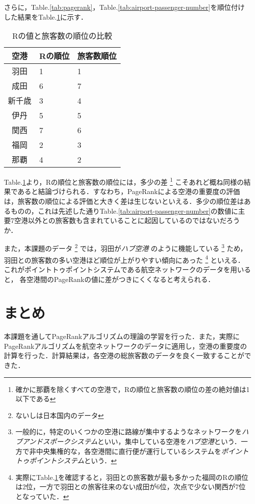 \documentclass[a4j, dvipdfmx, twocolumn]{jsarticle}
\newcommand{\tabref}[1]{Table.\ref{#1}}
\begin{document}
さらに，\tabref{tab:pagerank}，\tabref{tab:airport-passenger-number}を順位付けした結果を\tabref{tab:pagerank-airport-passenger-number}に示す．
\begin{table}[htb]
  \begin{tabular}{cll}
    \hline
    空港 & Rの順位 & 旅客数順位 \\
    \hline
    \hline
    羽田 & 1 & 1 \\
    成田 & 6 & 7 \\
    新千歳 & 3 & 4 \\
    伊丹 & 5 & 5 \\
    関西 & 7 & 6 \\
    福岡 & 2 & 3 \\
    那覇 & 4 & 2 \\
    \hline
  \end{tabular}
  \centering
  \caption{Rの値と旅客数の順位の比較}
  \label{tab:pagerank-airport-passenger-number}
\end{table}
\tabref{tab:pagerank-airport-passenger-number}より，Rの順位と旅客数の順位には，多少の差
\footnote{確かに那覇を除くすべての空港で，Rの順位と旅客数の順位の差の絶対値は1以下である}
こそあれど概ね同様の結果であると結論づけられる．すなわち，PageRankによる空港の重要度の評価は，旅客数の順位による評価と大きく差は生じないといえる．多少の順位差はあるものの，これは先述した通り\tabref{tab:airport-passenger-number}の数値に主要7空港以外との旅客数も含まれていることに起因しているのではないだろうか．

また，本課題のデータ
\footnote{ないしは日本国内のデータ}
では，羽田が\emph{ハブ空港} のように機能している
\footnote{一般的に，特定のいくつかの空港に路線が集中するようなネットワークを\emph{ハブアンドスポークシステム}といい，集中している空港を\emph{ハブ空港}という．一方で非中央集権的な，各空港間に直行便が運行しているシステムを\emph{ポイントトゥポイントシステム}という．}
ため，羽田との旅客数の多い空港ほど順位が上がりやすい傾向にあった
\footnote{実際に\tabref{tab:pagerank-airport-passenger-number}を確認すると，羽田との旅客数が最も多かった福岡のRの順位は2位，一方で羽田との旅客往来のない成田が6位，次点で少ない関西が7位となっていた．}
といえる．
これがポイントトゥポイントシステムである航空ネットワークのデータを用いると，
各空港間のPageRankの値に差がつきにくくなると考えられる．

\section{まとめ}
本課題を通してPageRankアルゴリズムの理論の学習を行った．また，実際にPageRankアルゴリズムを航空ネットワークのデータに適用し，空港の重要度の計算を行った．計算結果は，各空港の総旅客数のデータを良く一致することができた．
\end{document}
